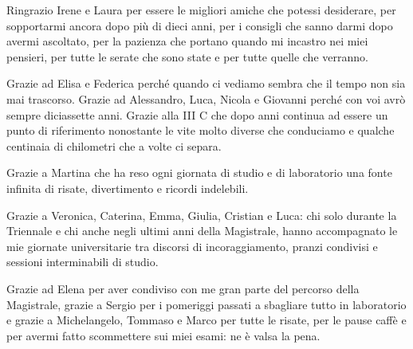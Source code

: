 Ringrazio Irene e Laura per essere le migliori amiche che potessi desiderare, per sopportarmi ancora dopo più di dieci anni, per i consigli che sanno darmi dopo avermi ascoltato, per la pazienza che portano quando mi incastro nei miei pensieri, per tutte le serate che sono state e per tutte quelle che verranno.

Grazie ad Elisa e Federica perché quando ci vediamo sembra che il tempo non sia mai trascorso. Grazie ad Alessandro, Luca, Nicola e Giovanni perché con voi avrò sempre diciassette anni. Grazie alla III C che dopo anni continua ad essere un punto di riferimento nonostante le vite molto diverse che conduciamo e qualche centinaia di chilometri che a volte ci separa.

Grazie a Martina che ha reso ogni giornata di studio e di laboratorio una fonte infinita di risate, divertimento e ricordi indelebili.

Grazie a Veronica, Caterina, Emma, Giulia, Cristian e Luca: chi solo durante la Triennale e chi anche negli ultimi anni della Magistrale, hanno accompagnato le mie giornate universitarie tra discorsi di incoraggiamento, pranzi condivisi e sessioni interminabili di studio.

Grazie ad Elena per aver condiviso con me gran parte del percorso della Magistrale, grazie a Sergio per i pomeriggi passati a sbagliare tutto in laboratorio e grazie a Michelangelo, Tommaso e Marco per tutte le risate, per le pause caffè e per avermi fatto scommettere sui miei esami: ne è valsa la pena.